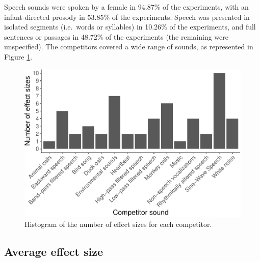 \documentclass[
  man,mask,floatsintext]{apa6}
\begin{document}
Speech sounds were spoken by a female in 94.87\% of the experiments, with an infant-directed prosody in 53.85\% of the experiments. Speech was presented in isolated segments (i.e.~words or syllables) in 10.26\% of the experiments, and full sentences or passages in 48.72\% of the experiments (the remaining were unspecified). The competitors covered a wide range of sounds, as represented in Figure \ref{fig:competitors}.

\begin{figure}
\centering
\includegraphics{MA_speech_pref_files/figure-latex/competitors-1.pdf}
\caption{\label{fig:competitors}Histogram of the number of effect sizes for each competitor.}
\end{figure}

\hypertarget{average-effect-size}{%
\subsection{Average effect size}\label{average-effect-size}}
\end{document}

